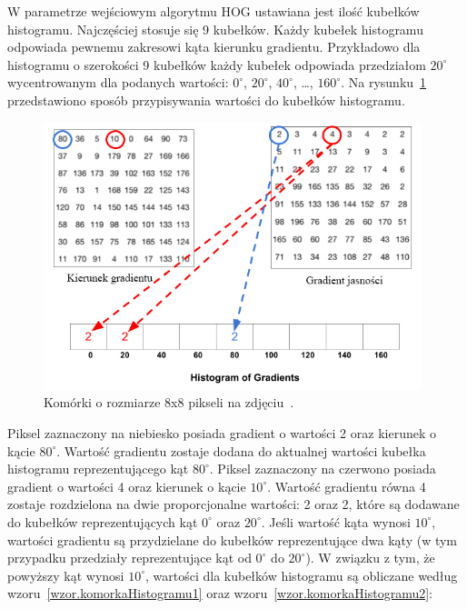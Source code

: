 \documentclass[a4paper,twoside,12pt]{book}
\begin{document}
    W parametrze wejściowym algorytmu HOG ustawiana jest ilość kubełków histogramu.
    Najczęściej stosuje się 9 kubełków. Każdy kubełek histogramu odpowiada pewnemu zakresowi kąta kierunku gradientu.
    Przykładowo dla histogramu o szerokości 9 kubełków każdy kubełek odpowiada przedziałom $20^{\circ}$ wycentrowanym
    dla podanych wartości:
    $0^{\circ}$, $20^{\circ}$, $40^{\circ}$, \ldots, $160^{\circ}$.
    Na rysunku~\ref{fig.hogTworzenieHistogramu} przedstawiono sposób przypisywania wartości do kubełków histogramu.
    \begin{figure}
        \centering
        \includegraphics[width=11cm]{Obrazy/hogTworzenieHistogramu.jpg}
        \caption{Komórki o rozmiarze 8x8 pikseli na zdjęciu~\cite{hogOpenCv}.}
        \label{fig.hogTworzenieHistogramu}
    \end{figure}
    Piksel zaznaczony na niebiesko posiada gradient o wartości 2 oraz kierunek o kącie $80^{\circ}$.
    Wartość gradientu zostaje dodana do aktualnej wartości kubełka histogramu reprezentującego kąt $80^{\circ}$.
    Piksel zaznaczony na czerwono posiada gradient o wartości 4 oraz kierunek o kącie $10^{\circ}$.
    Wartość gradientu równa 4 zostaje rozdzielona na dwie proporcjonalne wartości: 2 oraz 2, które są dodawane do
    kubełków reprezentujących kąt $0^{\circ}$ oraz $20^{\circ}$.
    Jeśli wartość kąta wynosi $10^{\circ}$, wartości gradientu są przydzielane do
    kubełków reprezentujące dwa kąty (w tym przypadku przedziały reprezentujące kąt od $0^{\circ}$ do
    $20^{\circ}$). W związku z tym, że powyższy kąt wynosi $10^{\circ}$, wartości dla kubełków histogramu są obliczane
    według wzoru~\ref{wzor.komorkaHistogramu1} oraz wzoru~\ref{wzor.komorkaHistogramu2}:
\end{document}
